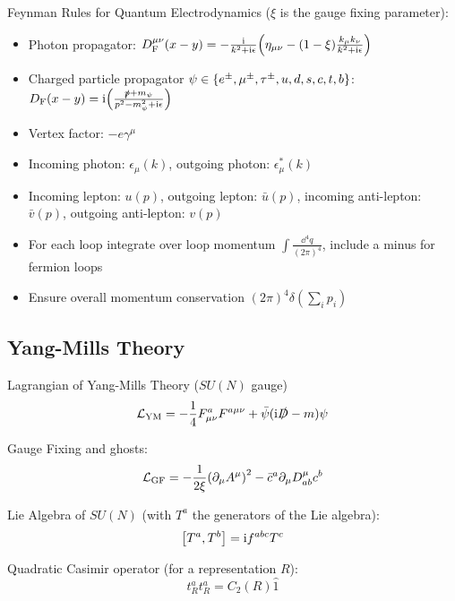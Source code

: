 		\noindent
		Feynman Rules for Quantum Electrodynamics ($\xi$ is the gauge fixing parameter):
		\begin{itemize}\itemsep -0pt
			\item Photon propagator: $D_\text{F}^{\mu\nu}(x-y) = -\frac{\mathrm{i}}{k^2+\mathrm{i}\epsilon} \qty(\eta_{\mu\nu}-(1-\xi)\frac{k_\mu k_\nu}{k^2+\mathrm{i}\epsilon} )$
			\item Charged particle propagator $\psi \in \qty{e^\pm, \mu^\pm ,\tau^\pm, u,d,s,c,t,b}$: $D_\text{F}(x-y) = \mathrm{i}\qty(\frac{\slashed{p}+m_\psi}{p^2-m_\psi^2+\mathrm{i}\epsilon})$
			\item Vertex factor: $-e\gamma^\mu$
			\item Incoming photon: $\epsilon_\mu(k)$, outgoing photon: $\epsilon^{*}_\mu(k)$
			\item Incoming lepton: $u(p)$, outgoing lepton: $\bar{u}(p)$, incoming anti-lepton: $\bar{v}(p)$, outgoing anti-lepton: $v(p)$
			\item For each loop integrate over loop momentum $\int \frac{\dd^4 q}{(2\pi)^4}$, include a minus for fermion loops
			\item Ensure overall momentum conservation $(2\pi)^4 \delta(\sum_i p_i)$
		\end{itemize}

	\subsection{Yang-Mills Theory}
		Lagrangian of Yang-Mills Theory ($SU(N)$ gauge)
		\begin{equation}
			\mathcal{L}_\text{YM} = -\frac{1}{4} F^a_{\mu\nu} F^{a\mu\nu} + \bar{\psi}(\mathrm{i}\slashed{D}-m)\psi
		\end{equation}

		\noindent
		Gauge Fixing and ghosts:
		\begin{equation}
			\mathcal{L}_\text{GF} = -\frac{1}{2\xi} \qty(\partial_\mu A^\mu)^2 - \bar{c}^a \partial_\mu D^\mu_{ab} c^b
		\end{equation}

		\noindent
		Lie Algebra of $SU(N)$ (with $T^a$ the generators of the Lie algebra):
		\begin{equation}
			\comm{T^a}{T^b} = \i f^{abc} T^c
		\end{equation}

		\noindent
		Quadratic Casimir operator (for a representation $R$):
		\begin{equation}
			t^a_R t^a_R = C_2(R) \hat{1}
		\end{equation}

